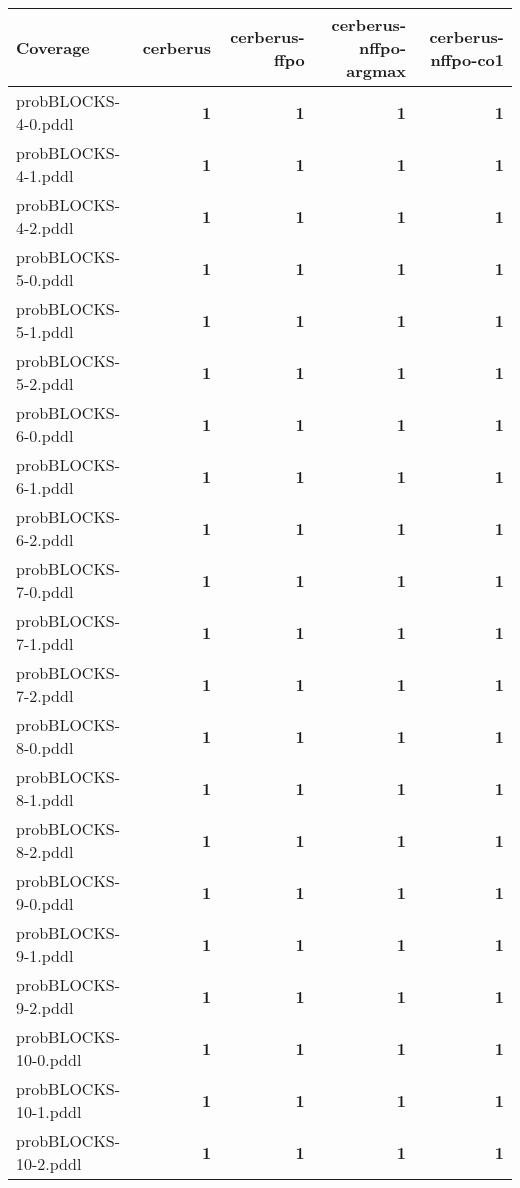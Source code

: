\documentclass{article}
\begin{document}
\begin{tabular}{@{}lrrrr@{}}
Coverage & cerberus & cerberus-ffpo & cerberus-nffpo-argmax & cerberus-nffpo-co1 \\
\midrule
probBLOCKS-4-0.pddl & \textbf{1} & \textbf{1} & \textbf{1} & \textbf{1} \\
probBLOCKS-4-1.pddl & \textbf{1} & \textbf{1} & \textbf{1} & \textbf{1} \\
probBLOCKS-4-2.pddl & \textbf{1} & \textbf{1} & \textbf{1} & \textbf{1} \\
probBLOCKS-5-0.pddl & \textbf{1} & \textbf{1} & \textbf{1} & \textbf{1} \\
probBLOCKS-5-1.pddl & \textbf{1} & \textbf{1} & \textbf{1} & \textbf{1} \\
probBLOCKS-5-2.pddl & \textbf{1} & \textbf{1} & \textbf{1} & \textbf{1} \\
probBLOCKS-6-0.pddl & \textbf{1} & \textbf{1} & \textbf{1} & \textbf{1} \\
probBLOCKS-6-1.pddl & \textbf{1} & \textbf{1} & \textbf{1} & \textbf{1} \\
probBLOCKS-6-2.pddl & \textbf{1} & \textbf{1} & \textbf{1} & \textbf{1} \\
probBLOCKS-7-0.pddl & \textbf{1} & \textbf{1} & \textbf{1} & \textbf{1} \\
probBLOCKS-7-1.pddl & \textbf{1} & \textbf{1} & \textbf{1} & \textbf{1} \\
probBLOCKS-7-2.pddl & \textbf{1} & \textbf{1} & \textbf{1} & \textbf{1} \\
probBLOCKS-8-0.pddl & \textbf{1} & \textbf{1} & \textbf{1} & \textbf{1} \\
probBLOCKS-8-1.pddl & \textbf{1} & \textbf{1} & \textbf{1} & \textbf{1} \\
probBLOCKS-8-2.pddl & \textbf{1} & \textbf{1} & \textbf{1} & \textbf{1} \\
probBLOCKS-9-0.pddl & \textbf{1} & \textbf{1} & \textbf{1} & \textbf{1} \\
probBLOCKS-9-1.pddl & \textbf{1} & \textbf{1} & \textbf{1} & \textbf{1} \\
probBLOCKS-9-2.pddl & \textbf{1} & \textbf{1} & \textbf{1} & \textbf{1} \\
probBLOCKS-10-0.pddl & \textbf{1} & \textbf{1} & \textbf{1} & \textbf{1} \\
probBLOCKS-10-1.pddl & \textbf{1} & \textbf{1} & \textbf{1} & \textbf{1} \\
probBLOCKS-10-2.pddl & \textbf{1} & \textbf{1} & \textbf{1} & \textbf{1} \\

\end{tabular}
\end{document}
